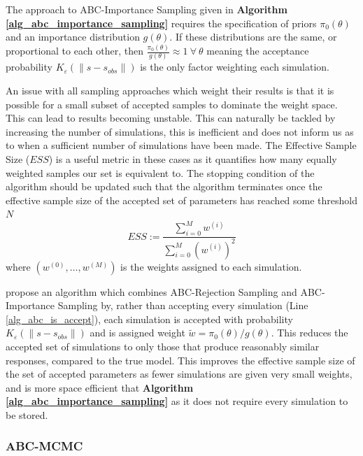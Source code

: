 \documentclass[11pt,a4paper]{article}
\theoremstyle{break}
\begin{document}
  \par The approach to ABC-Importance Sampling given in \textbf{Algorithm \ref{alg_abc_importance_sampling}} requires the specification of priors $\pi_0(\theta)$ and an importance distribution $g(\theta)$. If these distributions are the same, or proportional to each other, then $\frac{\pi_0(\theta)}{g(\theta)}\approx 1\ \forall\ \theta$ meaning the acceptance probability $K_\varepsilon(\|s-s_{obs}\|)$ is the only factor weighting each simulation.

  \par An issue with all sampling approaches which weight their results is that it is possible for a small subset of accepted samples to dominate the weight space. This can lead to results becoming unstable. This can naturally be tackled by increasing the number of simulations, this is inefficient and does not inform us as to when a sufficient number of simulations have been made. The Effective Sample Size ($ESS$) is a useful metric in these cases as it quantifies how many equally weighted samples our set is equivalent to. The stopping condition of the algorithm should be updated such that the algorithm terminates once the effective sample size of the accepted set of parameters has reached some threshold $N$
  \[ ESS:=\frac{\sum_{i=0}^M w^{(i)}}{\sum_{i=0}^M \left(w^{(i)}\right)^2} \]
  where $(w^{(0)},\dots,w^{(M)})$ is the weights assigned to each simulation.

  \par \cite[]{constructing_summary_statistics_for_approximate_bayesian_computation_semi_automatic_ABC} propose an algorithm which combines ABC-Rejection Sampling and ABC-Importance Sampling by, rather than accepting every simulation (Line \ref{alg_abc_is_accept}), each simulation is accepted with probability $K_\varepsilon(\|s-s_{obs}\|)$ and is assigned weight $\tilde{w}=\pi_0(\theta)/g(\theta)$. This reduces the accepted set of simulations to only those that produce reasonably similar responses, compared to the true model. This improves the effective sample size of the set of accepted parameters as fewer simulations are given very small weights, and is more space efficient that \textbf{Algorithm \ref{alg_abc_importance_sampling}} as it does not require every simulation to be stored.

\subsubsection{ABC-MCMC}\label{sec_abc_mcmc}
\end{document}
